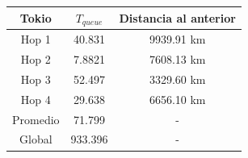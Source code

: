 \begin{center}
\vspace{1cm}
\begin{tabular}{| c | c | c |}	\hline
	Tokio 	& $T_{queue}$	& Distancia al anterior 	\\ \hline
	Hop 1	& 40.831 	& 9939.91 km			\\ \hline
	Hop 2	& 7.8821		& 7608.13 km		\\ \hline
	Hop 3	& 52.497		& 3329.60 km 	\\ \hline
	Hop 4	& 29.638		& 6656.10 km 	\\ \hline
	Promedio & 71.799	& -	\\ \hline
	Global	& 933.396	& -	\\ \hline
\end{tabular}
\end{center}
